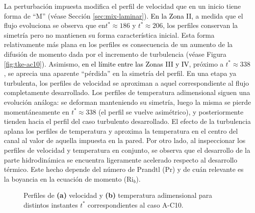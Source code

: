 La perturbación impuesta modifica el perfil de velocidad que en un inicio tiene forma de ``M'' (véase Sección \ref{sec:mix-laminar}). \textcolor{black}{En la Zona II,} a medida que el flujo evoluciona se observa que en\linebreak $t^* \approx 186$ y $t^* \approx 206$, los perfiles conservan la simetría pero no mantienen su forma \linebreak característica inicial. Esta forma relativamente más plana en los perfiles es consecuencia de un aumento de la difusión de momento dada por el incremento de turbulencia (véase Figura \ref{fig:tke-ac10}). Asimismo, \textcolor{black}{en el límite entre las Zonas III y IV}, próximo a $t^* \approx 338$, se aprecia una aparente ``pérdida'' en la simetría del perfil. En una etapa ya turbulenta, los perfiles de velocidad se aproximan a aquel correspondiente al flujo completamente desarrollado. Los perfiles de temperatura adimensional siguen una evolución análoga: se deforman manteniendo su simetría, luego la misma se pierde momentáneamente en $t^* \approx 338$ (el perfil se vuelve asimétrico), y posteriormente tienden hacia el perfil del caso turbulento desarrollado. El efecto de la turbulencia aplana los perfiles de temperatura y aproxima la temperatura en el centro del canal al valor de aquella impuesta en la pared. Por otro lado, al inspeccionar los perfiles de velocidad y temperatura en conjunto, se observa que el desarrollo de la parte hidrodinámica se encuentra ligeramente acelerado respecto al desarrollo térmico. Este hecho depende del número de Prandtl (Pr) y de cuán relevante es la boyancia en la ecuación de momento (Ri$_b$).

\begin{figure}[H]
  \centering  
  
  \caption{Perfiles de \textbf{(a)} velocidad y \textbf{(b)} temperatura adimensional para distintos instantes $t^*$ correspondientes al caso A-C10.}
  \label{fig:mosaico-ac10}
\end{figure} 

